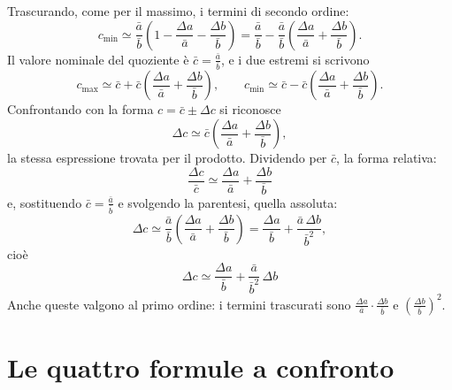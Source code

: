 \documentclass[11pt,a4paper]{article}
\begin{document}
Trascurando, come per il massimo, i termini di secondo ordine:
\begin{equation*}
c_{\min} \simeq \frac{\bar a}{\bar b}\left(1 - \frac{\Delta a}{\bar a} - \frac{\Delta b}{\bar b}\right)
= \frac{\bar a}{\bar b} - \frac{\bar a}{\bar b}\left(\frac{\Delta a}{\bar a} + \frac{\Delta b}{\bar b}\right).
\end{equation*}
Il valore nominale del quoziente è $\bar c = \frac{\bar a}{\bar b}$, e i due
estremi si scrivono
\begin{equation*}
c_{\max} \simeq \bar c + \bar c\left(\frac{\Delta a}{\bar a} + \frac{\Delta b}{\bar b}\right),
\qquad
c_{\min} \simeq \bar c - \bar c\left(\frac{\Delta a}{\bar a} + \frac{\Delta b}{\bar b}\right).
\end{equation*}
Confrontando con la forma $c = \bar c \pm \Delta c$ si riconosce
\begin{equation*}
\Delta c \simeq \bar c\left(\frac{\Delta a}{\bar a} + \frac{\Delta b}{\bar b}\right),
\end{equation*}
la stessa espressione trovata per il prodotto. Dividendo per $\bar c$, la
forma relativa:
\begin{equation*}
\boxed{\,\frac{\Delta c}{\bar c} \simeq \frac{\Delta a}{\bar a} + \frac{\Delta b}{\bar b}\,}
\end{equation*}
e, sostituendo $\bar c = \frac{\bar a}{\bar b}$ e svolgendo la parentesi,
quella assoluta:
\begin{equation*}
\Delta c \simeq \frac{\bar a}{\bar b}\left(\frac{\Delta a}{\bar a} + \frac{\Delta b}{\bar b}\right)
= \frac{\Delta a}{\bar b} + \frac{\bar a\,\Delta b}{\bar b^{2}},
\end{equation*}
cioè
\begin{equation*}
\boxed{\,\Delta c \simeq \frac{\Delta a}{\bar b} + \frac{\bar a}{\bar b^{2}}\,\Delta b\,}
\end{equation*}
Anche queste valgono al primo ordine: i termini trascurati sono
$\frac{\Delta a}{\bar a}\cdot\frac{\Delta b}{\bar b}$ e
$\left(\frac{\Delta b}{\bar b}\right)^{2}$.

\section*{Le quattro formule a confronto}
\end{document}
